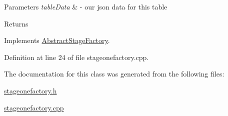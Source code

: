 \begin{DoxyParams}{Parameters}
{\em table\+Data} & -\/ our json data for this table \\
\hline
\end{DoxyParams}
\begin{DoxyReturn}{Returns}

\end{DoxyReturn}


Implements \mbox{\hyperlink{class_abstract_stage_factory_a539c855ce9a09e08b7fcb3ffa7f0d3fd}{Abstract\+Stage\+Factory}}.



Definition at line 24 of file stageonefactory.\+cpp.



The documentation for this class was generated from the following files\+:\begin{DoxyCompactItemize}
\item 
\mbox{\hyperlink{stageonefactory_8h}{stageonefactory.\+h}}\item 
\mbox{\hyperlink{stageonefactory_8cpp}{stageonefactory.\+cpp}}\end{DoxyCompactItemize}
